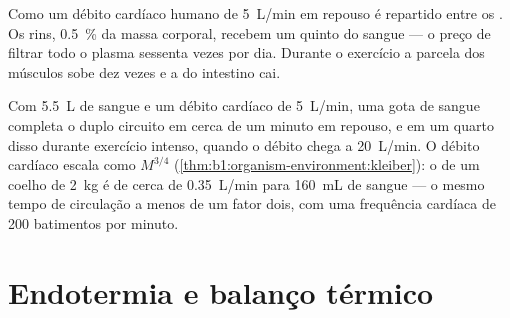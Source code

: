 \begin{omfigure}

{\small Como um débito cardíaco humano de \qty{5}{L/min} em repouso é
repartido entre os . Os rins, \qty{0.5}{\%} da massa corporal,
recebem um quinto do sangue --- o preço de filtrar todo o plasma
sessenta vezes por dia. Durante o exercício a parcela dos músculos sobe
dez vezes e a do intestino cai.}
\end{omfigure}

\begin{example}\label{ex:b1:mammal-organization:circtime}
Com \qty{5.5}{L} de sangue e um débito cardíaco de \qty{5}{L/min}, uma
gota de sangue completa o duplo circuito em cerca de um minuto em
repouso, e em um quarto disso durante exercício intenso, quando o débito
chega a \qty{20}{L/min}. O débito cardíaco escala como $M^{3/4}$
(\cref{thm:b1:organism-environment:kleiber}): o de um coelho de
\qty{2}{kg} é de cerca de \qty{0.35}{L/min} para \qty{160}{mL} de
sangue --- o mesmo tempo de circulação a menos de um fator dois, com uma
frequência cardíaca de \qty{200}{} batimentos por minuto.
\end{example}

\section{Endotermia e balanço térmico}

